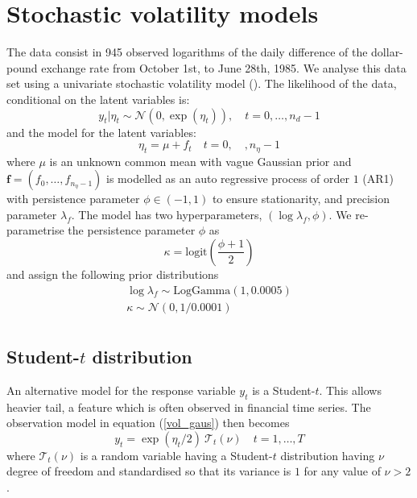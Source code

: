 \documentclass[a4paper,11pt]{article}
\def\mm#1{\ensuremath{\boldsymbol{#1}}} %
\begin{document}


\section*{Stochastic volatility models}

 The data consist in 945 observed logarithms of the daily
    difference of the dollar-pound exchange rate from October 1st, to
    June 28th, 1985. 
    We analyse this data set using a univariate stochastic volatility
    model (\cite{book1000}).  The likelihood of the data, conditional
    on the latent variables is:
    \begin{equation}\label{vol_gaus}
        y_t|\eta_t\sim\mathcal{N}(0,\exp(\eta_t)), \quad t=0,\dots,n_d-1
    \end{equation}
    and the model for the latent variables:
    \begin{equation}\label{vol_latent}
        \eta_t=\mu+f_t \quad t=0,\quad,n_{\eta}-1
    \end{equation}
    where $\mu$ is an unknown common mean with vague Gaussian prior
    and $\mm{f}=(f_0,\dots,f_{n_{\eta}-1})$ is modelled as an auto
    regressive process of order $1$ (AR1) with persistence parameter
    $\phi\in(-1,1)$ to ensure stationarity, and precision parameter
    $\lambda_f$.
  The model has two hyperparameters, $(\log\lambda_f,\phi)$. We
    re-parametrise the persistence parameter $\phi$ as
    \[
    \kappa=\text{logit}\left(\frac{\phi+1}{2}\right)
    \]
    and assign the following prior distributions
    \[
    \begin{array}{l}
        \log\lambda_f\sim\text{LogGamma}(1,0.0005)\\
        \kappa\sim\mathcal{N}(0,1/0.0001)\\
    \end{array}
    \]
\subsection*{Student-$t$  distribution}
An alternative model for the response variable $y_t$ is a
Student-$t$. This allows heavier tail, a feature which is often
observed in financial time series. The observation model in equation
(\ref{vol_gaus}) then becomes
\begin{equation}\label{vol_stud}
    y_t = \exp(\eta_t/2)\ \mathcal{T}_t(\nu)\quad t=1,\dots,T
\end{equation}
where $\mathcal{T}_t(\nu)$ is a random variable having a Student-$t$
distribution having $\nu$ degree of freedom and standardised so that
its variance is $1$ for any value of $\nu>2$.
\end{document}
